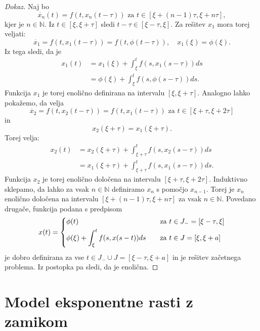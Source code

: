 \documentclass[12pt,a4paper]{amsart}
\theoremstyle{definition} %
\theoremstyle{plain} %
\newcommand{\N}{\mathbb N}
\begin{document}
\begin{proof}[Dokaz]
    Naj bo \[\dot{x_{n}}(t)=f(t,x_{n}(t-\tau)) \text{ za } t \in [\xi + (n-1)\tau,\xi + n\tau],\]
    kjer je $n \in \N$.
    Iz $t \in [\xi, \xi + \tau]$ sledi $t-\tau \in [\xi - \tau, \xi]$. Za rešitev $x_{1}$ mora torej veljati:
    \[\dot{x_{1}}=f(t,x_{1}(t-\tau))=f(t,\phi(t-\tau)),\quad x_{1}(\xi)=\phi(\xi).\]
    Iz tega sledi, da je
    \begin{equation*}
        \begin{split}
            x_{1}(t) &= x_{1}(\xi) + \int_{\xi}^{t}f(s, x_{1}(s-\tau))ds \\
            & = \phi(\xi) + \int_{\xi}^{t}f(s,\phi(s-\tau))ds.
        \end{split}      
        \end{equation*}
    Funkcija $x_{1}$ je torej enolično definirana na intervalu $[\xi, \xi + \tau]$. Analogno lahko pokažemo, da velja
    \[\dot{x_{2}}=f(t,x_{2}(t-\tau))=f(t,x_{1}(t-\tau)) \text{ za } t \in [\xi + \tau, \xi + 2\tau]\] in 
    \[x_{2}(\xi + \tau)=x_{1}(\xi + \tau).\]
    Torej velja:
    \begin{equation*}
        \begin{split}
            x_{2}(t) &= x_{2}(\xi + \tau) + \int_{\xi + \tau}^{t}f(s, x_{2}(s-\tau))ds \\
            & = x_{1}(\xi + \tau) + \int_{\xi + \tau}^{t}f(s, x_{1}(s-\tau))ds.
        \end{split}      
        \end{equation*}
    Funkcija $x_{2}$ je torej enolično določena na intervalu $[\xi + \tau,\xi + 2\tau]$. Induktivno sklepamo, da lahko za vsak 
    $n \in \N$ definiramo $x_{n}$ s pomočjo $x_{n-1}$. Torej je $x_{n}$ enolično določena na intervalu 
    $[\xi + (n-1)\tau, \xi + n\tau]$ za vsak $n \in \N$. Povedano drugače, funkcija podana s predpisom
    \[
        x(t) =
        \begin{dcases}
            \phi(t) &\quad \text{za  } t \in J_{-}=[\xi - \tau, \xi] \\
            \phi(\xi) + \int_{\xi}^{t}f(s,x(s-t))ds &\quad \text{za  } t \in J=[\xi, \xi +a] \\
        \end{dcases}
    \]
    je dobro definirana za vse $t \in J_{-} \cup J = [\xi - \tau, \xi + a]$ in je rešitev začetnega problema. Iz 
    postopka pa sledi, da je enolična.
\end{proof}

\section{Model eksponentne rasti z zamikom}
\end{document}
